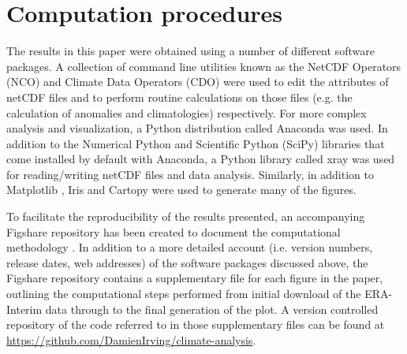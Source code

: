 \section{Computation procedures}\label{s:computation}

The results in this paper were obtained using a number of different software packages. A collection of command line utilities known as the NetCDF Operators (NCO) and Climate Data Operators (CDO) were used to edit the attributes of netCDF files and to perform routine calculations on those files (e.g. the calculation of anomalies and climatologies) respectively. For more complex analysis and visualization, a Python distribution called Anaconda was used. In addition to the Numerical Python \citep[NumPy;][]{VanDerWalt2011} and Scientific Python (SciPy) libraries that come installed by default with Anaconda, a Python library called xray was used for reading/writing netCDF files and data analysis. Similarly, in addition to Matplotlib \citep[the default Python plotting library;][]{Hunter2007}, Iris and Cartopy were used to generate many of the figures.

To facilitate the reproducibility of the results presented, an accompanying Figshare repository has been created to document the computational methodology \citep{Irving2015}. In addition to a more detailed account (i.e. version numbers, release dates, web addresses) of the software packages discussed above, the Figshare repository contains a supplementary file for each figure in the paper, outlining the computational steps performed from initial download of the ERA-Interim data through to the final generation of the plot. A version controlled repository of the code referred to in those supplementary files can be found at \url{https://github.com/DamienIrving/climate-analysis}.

    
    
  
  